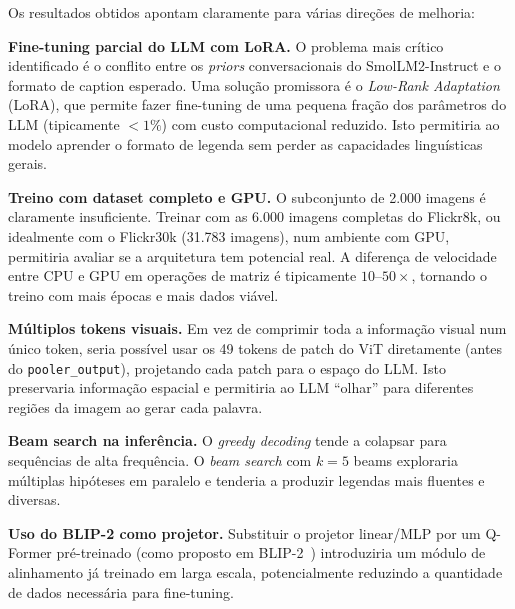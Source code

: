 \documentclass[conference]{IEEEtran}
\begin{document}
Os resultados obtidos apontam claramente para várias direções de melhoria:

\textbf{Fine-tuning parcial do LLM com LoRA.} O problema mais crítico identificado é o conflito entre os \textit{priors} conversacionais do SmolLM2-Instruct e o formato de caption esperado. Uma solução promissora é o \textit{Low-Rank Adaptation} (LoRA), que permite fazer fine-tuning de uma pequena fração dos parâmetros do LLM (tipicamente $<1\%$) com custo computacional reduzido. Isto permitiria ao modelo aprender o formato de legenda sem perder as capacidades linguísticas gerais.

\textbf{Treino com dataset completo e GPU.} O subconjunto de 2.000 imagens é claramente insuficiente. Treinar com as 6.000 imagens completas do Flickr8k, ou idealmente com o Flickr30k (31.783 imagens), num ambiente com GPU, permitiria avaliar se a arquitetura tem potencial real. A diferença de velocidade entre CPU e GPU em operações de matriz é tipicamente $10\text{--}50\times$, tornando o treino com mais épocas e mais dados viável.

\textbf{Múltiplos tokens visuais.} Em vez de comprimir toda a informação visual num único token, seria possível usar os 49 tokens de patch do ViT diretamente (antes do \texttt{pooler\_output}), projetando cada patch para o espaço do LLM. Isto preservaria informação espacial e permitiria ao LLM ``olhar'' para diferentes regiões da imagem ao gerar cada palavra.

\textbf{Beam search na inferência.} O \textit{greedy decoding} tende a colapsar para sequências de alta frequência. O \textit{beam search} com $k=5$ beams exploraria múltiplas hipóteses em paralelo e tenderia a produzir legendas mais fluentes e diversas.

\textbf{Uso do BLIP-2 como projetor.} Substituir o projetor linear/MLP por um Q-Former pré-treinado (como proposto em BLIP-2~\cite{b5}) introduziria um módulo de alinhamento já treinado em larga escala, potencialmente reduzindo a quantidade de dados necessária para fine-tuning.
\end{document}
